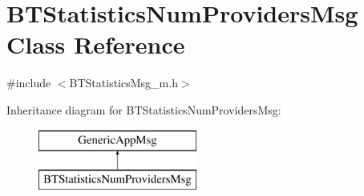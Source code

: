 \hypertarget{classBTStatisticsNumProvidersMsg}{}\section{B\+T\+Statistics\+Num\+Providers\+Msg Class Reference}
\label{classBTStatisticsNumProvidersMsg}


{\ttfamily \#include $<$B\+T\+Statistics\+Msg\+\_\+m.\+h$>$}

Inheritance diagram for B\+T\+Statistics\+Num\+Providers\+Msg\+:\begin{figure}[H]
\begin{center}
\leavevmode
\includegraphics[height=2.000000cm]{classBTStatisticsNumProvidersMsg}
\end{center}
\end{figure}
